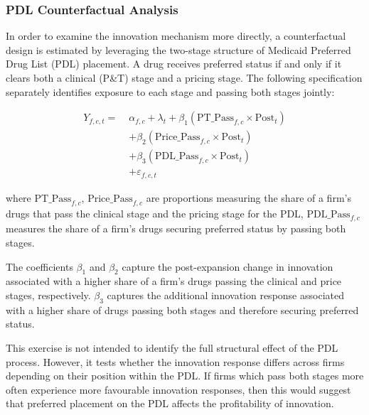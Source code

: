 \documentclass[12pt]{article}
\begin{document}
\subsubsection{PDL Counterfactual Analysis}

In order to examine the innovation mechanism more directly, a counterfactual design is estimated by leveraging the two-stage structure of Medicaid Preferred Drug List (PDL) placement. A drug receives preferred status if and only if it clears both a clinical (P\&T) stage and a pricing stage. The following specification separately identifies exposure to each stage and passing both stages jointly:

\begin{equation}
\begin{aligned}
Y_{f,c,t} =\;&
\alpha_{f,c} + \lambda_t + \beta_1\left(\text{PT\_Pass}_{f,c} \times \text{Post}_t\right) \\
&+ \beta_2\left(\text{Price\_Pass}_{f,c} \times \text{Post}_t\right) \\
&+ \beta_3\left(\text{PDL\_Pass}_{f,c} \times \text{Post}_t\right) \\
&+ \varepsilon_{f,c,t}
\end{aligned}
\end{equation}

where $\text{PT\_Pass}_{f,c}$, $\text{Price\_Pass}_{f,c}$ are proportions measuring the share of a firm's drugs that pass the clinical stage and the pricing stage for the PDL, $\text{PDL\_Pass}_{f,c}$ measures the share of a firm's drugs securing preferred status by passing both stages.

The coefficients $\beta_1$ and $\beta_2$ capture the post-expansion change in innovation associated with a higher share of a firm's drugs passing the clinical and price stages, respectively. $\beta_3$ captures the additional innovation response associated with a higher share of drugs passing both stages and therefore securing preferred status.

This exercise is not intended to identify the full structural effect of the PDL process. However, it tests whether the innovation response differs across firms depending on their position within the PDL. If firms which pass both stages more often experience more favourable innovation responses, then this would suggest that preferred placement on the PDL affects the profitability of innovation.

\newpage



\end{document}
